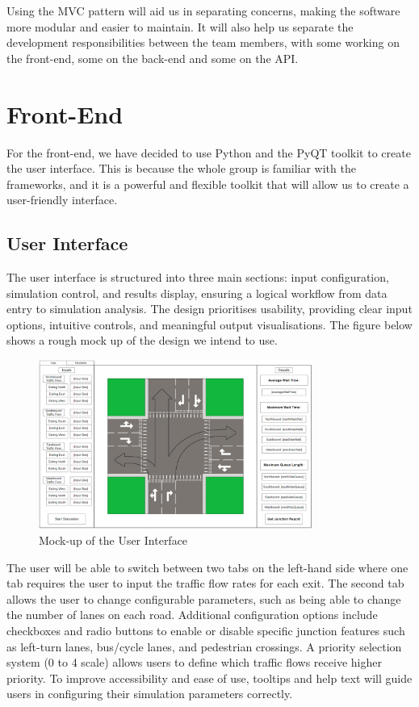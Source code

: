 \documentclass{article}
\begin{document}
Using the MVC pattern will aid us in separating concerns, making the software more modular and easier to maintain. It will also help us separate the development responsibilities between the team members, with some working on the front-end, some on the back-end and some on the API.

\section{Front-End}
For the front-end, we have decided to use Python and the PyQT toolkit to create the user interface. This is because the whole group is familiar 
with the frameworks, and it is a powerful and flexible toolkit that will allow us to create a user-friendly interface.

\subsection{User Interface}
The user interface is structured into three main sections: input configuration, simulation
control, and results display, ensuring a logical workflow from data entry to simulation
analysis. The design prioritises usability, providing clear input options, intuitive controls, and
meaningful output visualisations. The figure below shows a rough mock up of the design we intend to use.


\begin{figure}[H]
    \centering
    \includegraphics[width=0.8\textwidth]{frontendUI.png}
    \caption{Mock-up of the User Interface}
    \label{frontendUI}
\end{figure}

The user will be able to switch between two tabs on the left-hand side where one tab requires the user to input the traffic flow rates for each exit. The second tab allows the user to change configurable parameters, such as being able to change the number of lanes on each road. Additional
configuration options include checkboxes and radio buttons to enable or disable specific junction features such as left-turn lanes, bus/cycle lanes, and pedestrian crossings. A priority selection system (0 to 4 scale) allows users to define which traffic flows receive higher priority. To improve accessibility and ease of use, tooltips and help text will guide users in configuring their simulation parameters correctly.
\end{document}
